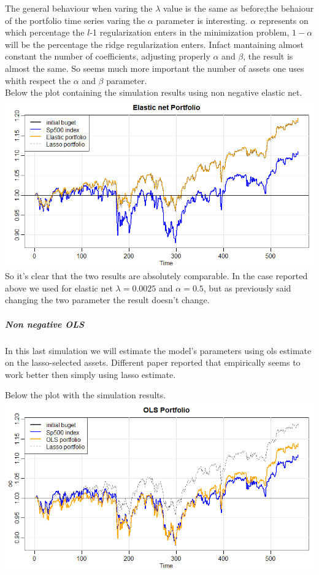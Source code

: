 \documentclass{article}%
\begin{document}
The general behaviour when varing the $\lambda$ value is the same as before;the behaiour of the portfolio time series varing the $\alpha$ parameter is interesting. $\alpha$ represents on which percentage the $l$-1 regularization enters in the minimization problem, $1-\alpha$ will be the percentage the ridge regularization enters. Infact mantaining almost constant the number of coefficients, adjusting properly $\alpha$ and $\beta$, the result is almost the same. So seems much more important the number of assets one uses whith respect the $\alpha$ and $\beta$ parameter.
\\

Below the plot containing the simulation results using non negative elastic net.
\\

\includegraphics[scale=0.60]{elasticportfolio}
\\

So it's clear that the two results are absolutely comparable. In the case reported above we used for elastic net $\lambda=0.0025$ and $\alpha=0.5$, but as previously said changing the two parameter the result doesn't change.

\subparagraph{Non negative OLS}
In this last simulation we will estimate the model's parameters using ols estimate on the lasso-selected assets. Different paper reported that empirically seems to work better then simply using lasso estimate. 

Below the plot with the simulation results.
\\

\includegraphics[scale=0.60]{olsportfolio}
\\
\end{document}
